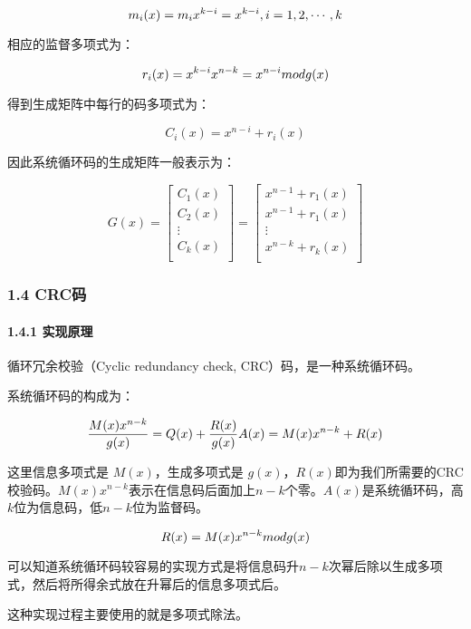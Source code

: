 \documentclass[
]{article}
\begin{document}
\[m_i(x)=m_ix^{k-i}=x^{k-i},\space i=1,2,\cdots,k\]

相应的监督多项式为：

\[r_i(x)=x^{k-i}x^{n-k}=x^{n-i}\space mod \space g(x)\]

得到生成矩阵中每行的码多项式为：

\[C_i(x)=x^{n-i}+r_i(x)\]

因此系统循环码的生成矩阵一般表示为：

\[G(x)=
\left[
\begin{matrix}
C_1(x)\\
C_2(x)\\
 \vdots \\
C_k(x)\\
\end{matrix}
\right]
=
\left[
\begin{matrix}
x^{n-1}+r_1(x)\\
x^{n-1}+r_1(x)\\
 \vdots \\
x^{n-k}+r_k(x)\\
\end{matrix}
\right]\]

\hypertarget{header-n78}{%
\subsubsection{1.4 CRC码}\label{header-n78}}

\hypertarget{header-n79}{%
\paragraph{1.4.1 实现原理}\label{header-n79}}

循环冗余校验（Cyclic redundancy check, CRC）码，是一种系统循环码。

系统循环码的构成为：

\[\frac{M(x)x^{n-k}}{g(x)} = Q(x) + \frac{R(x)}{g(x)}\\
A(x)=M(x)x^{n-k}+R(x)\]

这里信息多项式是 \(M(x)\)，生成多项式是
\(g(x)\)，\(R(x)\)即为我们所需要的CRC校验码。\(M(x)x^{n-k}\)表示在信息码后面加上\(n-k\)个零。\(A(x)\)是系统循环码，高\(k\)位为信息码，低\(n-k\)位为监督码。

\[R(x)=M(x)x^{n-k} \space mod \space g(x)\]

可以知道系统循环码较容易的实现方式是将信息码升\(n-k\)次幂后除以生成多项式，然后将所得余式放在升幂后的信息多项式后。

这种实现过程主要使用的就是多项式除法。
\end{document}
